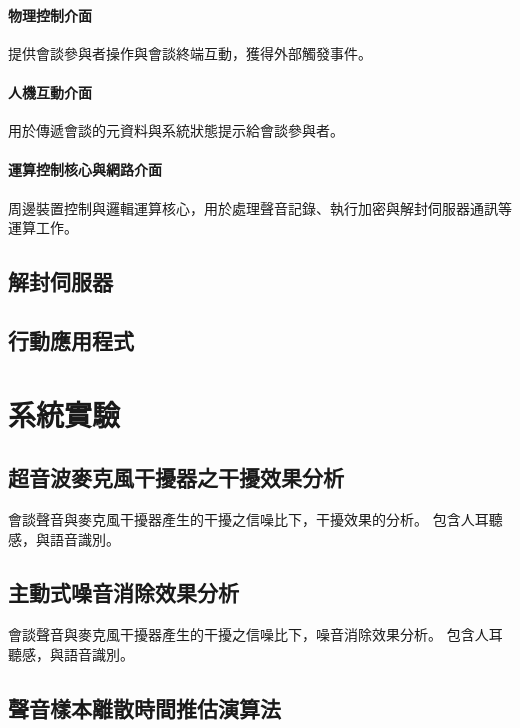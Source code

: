 \paragraph{物理控制介面}

    提供會談參與者操作與會談終端互動，獲得外部觸發事件。

\paragraph{人機互動介面}

    用於傳遞會談的元資料與系統狀態提示給會談參與者。

\paragraph{運算控制核心與網路介面}

    周邊裝置控制與邏輯運算核心，用於處理聲音記錄、執行加密與解封伺服器通訊等運算工作。



\subsection{解封伺服器}


\subsection{行動應用程式}


\section{系統實驗}

\subsection{超音波麥克風干擾器之干擾效果分析}

    會談聲音與麥克風干擾器產生的干擾之信噪比下，干擾效果的分析。
包含人耳聽感，與語音識別。


\subsection{主動式噪音消除效果分析}

    會談聲音與麥克風干擾器產生的干擾之信噪比下，噪音消除效果分析。
包含人耳聽感，與語音識別。


\subsection{聲音樣本離散時間推估演算法}

